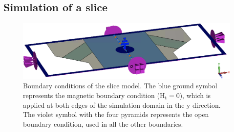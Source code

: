 \subsection[Simulation of a slice]{Simulation of a slice}\label{sec:slice_model}

\begin{figure}[!b]
\centering
\includegraphics[width=14cm, keepaspectratio]{pictures/slice_boundary}
\vspace{1mm}
\caption{Boundary conditions of the slice model. The blue ground symbol represents the magnetic boundary condition (${\text{H}_\text{t}=0}$), which is applied at both edges of the simulation domain in the y direction. The violet symbol with the four pyramids represents the open boundary condition, used in all the other boundaries.}\label{fig:slice_boundaries}

\vspace{3mm}


\end{figure}
